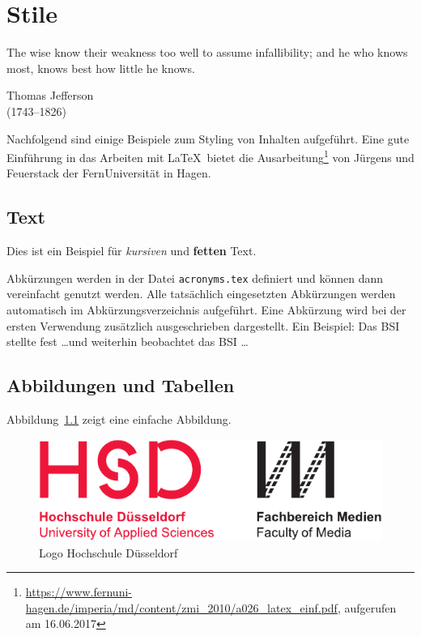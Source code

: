 \chapter{Stile}

\epigraph{\glqq The wise know their weakness too well to assume infallibility; and he who knows most, knows best how little he knows.\grqq\bigskip}%
{{Thomas Jefferson}\\ (1743--1826)}

\noindent
Nachfolgend sind einige Beispiele zum Styling von Inhalten aufgeführt.
Eine gute Einführung in das Arbeiten mit \LaTeX\ bietet die
Ausarbeitung\footnote{\url{https://www.fernuni-hagen.de/imperia/md/content/zmi_2010/a026_latex_einf.pdf}, aufgerufen am 16.06.2017}
von Jürgens und Feuerstack der FernUniversität in Hagen.

\indent

\section{Text}
\label{text}
Dies ist ein Beispiel für \textit{kursiven} und \textbf{fetten} Text.

\bigskip

Abkürzungen werden in der Datei \texttt{acronyms.tex} definiert und können dann vereinfacht genutzt werden. Alle tatsächlich eingesetzten
Abkürzungen werden automatisch im Abkürzungsverzeichnis aufgeführt. Eine Abkürzung wird bei der ersten Verwendung zusätzlich ausgeschrieben
dargestellt. Ein Beispiel: Das \ac{BSI} stellte fest \dots und weiterhin beobachtet das \ac{BSI} \dots

\section{Abbildungen und Tabellen}

Abbildung~\ref{fig:hsd_logo} zeigt eine einfache Abbildung.

\begin{figure}[hbtp]
  \centering
  \includegraphics[width=.6\textwidth]{figures/hsd_m_logo.pdf}
  \caption{Logo Hochschule Düsseldorf}
  \label{fig:hsd_logo}
\end{figure}

